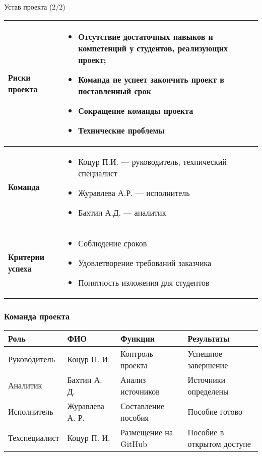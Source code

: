 \documentclass{beamer}
\begin{document}
 \begin{frame}{Устав проекта (2/2)}
 	\footnotesize
 	\setlength{\tabcolsep}{4pt}
 	\renewcommand{\arraystretch}{1.2}
 	
 	\begin{longtable}{|p{3cm}|p{8cm}|}
 		\hline
 		\textbf{Риски проекта} & 
 		\begin{itemize}
 			\setlength{\itemsep}{0pt}
 			\item Отсутствие достаточных навыков и компетенций у студентов, реализующих проект;
 			\item Команда не успеет закончить проект в поставленный срок
 			\item Сокращение команды проекта
 			\item Технические проблемы
 		\end{itemize} \\ \hline
 		
 		\textbf{Команда} & 
 		\begin{itemize}
 			\setlength{\itemsep}{0pt}
 			\item Коцур П.И. — руководитель, технический специалист
 			\item Журавлева А.Р. — исполнитель
 			\item Бахтин А.Д. — аналитик
 		\end{itemize} \\ \hline
 		
 		\textbf{Критерии успеха} & 
 		\begin{itemize}
 			\setlength{\itemsep}{0pt}
 			\item Соблюдение сроков
 			\item Удовлетворение требований заказчика
 			\item Понятность изложения для студентов
 		\end{itemize} \\ \hline
 	\end{longtable}
 \end{frame}
 
 \begin{frame}\frametitle{Команда проекта }
 	\setlength{\tabcolsep}{3pt}
 	\begin{longtable}{|p{2.5cm}|p{2.5cm}|p{3cm}|p{3cm}|}
 		\hline
 		\textbf{Роль} & \textbf{ФИО} & \textbf{Функции} & \textbf{Результаты} \\ \hline
 		Руководитель & Коцур П. И. & Контроль проекта & Успешное завершение \\ \hline
 		Аналитик & Бахтин А. Д. & Анализ источников & Источники определены \\ \hline
 		Исполнитель & Журавлева А. Р. & Составление пособия & Пособие готово \\ \hline
 		Техспециалист & Коцур П. И. & Размещение на GitHub & Пособие в открытом доступе \\ \hline
 	\end{longtable} 
 \end{frame}
 
\end{document}
